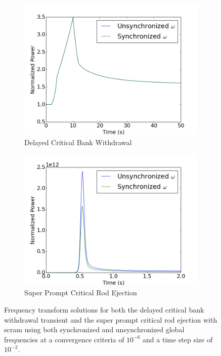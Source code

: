 \documentclass[12pt]{report}
\begin{document}
	\begin{figure}[ht]
		\centering
		\begin{subfigure}{.49\textwidth}
			\centering
			\includegraphics[width=.95\linewidth]{figs/sync_case1.png}
			\caption{Delayed Critical Bank Withdrawal}
			\label{fig::sync_case1}
		\end{subfigure}
		\begin{subfigure}{.49\textwidth}
			\centering
			\includegraphics[width=.95\linewidth]{figs/sync_case2.png}
			\caption{Super Prompt Critical Rod Ejection}
			\label{fig::sync_case2}
		\end{subfigure}
		\caption{Frequency transform solutions for both the delayed critical bank withdrawal transient and the super prompt critical rod ejection with scram using both synchronized and unsynchronized global frequencies at a convergence criteria  of $10^{-6}$ and a time step size of $10^{-2}$.}
		\label{fig::sync}
	\end{figure}
\end{document}
